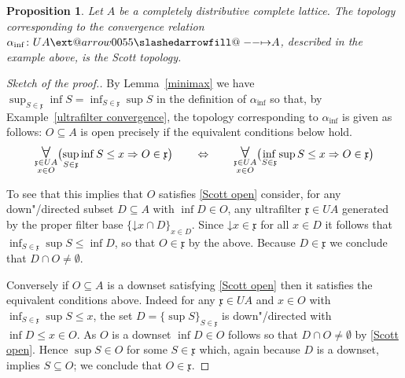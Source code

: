 \documentclass[preprint, a4paper]{elsarticle}
\makeatletter
\def\slashedarrowfill@#1#2#3#4#5{%
  $\m@th\thickmuskip0mu\medmuskip\thickmuskip\thinmuskip\thickmuskip
   \relax#5#1\mkern-7mu%
   \cleaders\hbox{$#5\mkern-2mu#2\mkern-2mu$}\hfill
   \mathclap{#3}\mathclap{#2}%
   \cleaders\hbox{$#5\mkern-2mu#2\mkern-2mu$}\hfill
   \mkern-7mu#4$%
}
\def\rightslashedarrowfill@{%
  \slashedarrowfill@\relbar\relbar\mapstochar\rightarrow}
\newcommand\xslashedrightarrow[2][]{%
  \ext@arrow 0055{\rightslashedarrowfill@}{#1}{#2}}
\def\slashedrightarrow{\xslashedrightarrow{}}
\newtheorem{proposition}[theorem]{Proposition}
\theoremstyle{definition}
\theoremstyle{remark}
\providecommand{\exref}[1]{Example~\ref{#1}}
\providecommand{\lemref}[1]{Lemma~\ref{#1}}
\renewcommand{\implies}{\Rightarrow}
\renewcommand{\iff}{\Leftrightarrow}
\providecommand{\mf}[1]{\mathfrak{#1}}
\providecommand{\brcs}[1]{\lbrace #1 \rbrace}
\providecommand{\bigpars}[1]{\bigl(#1\bigr)}
\providecommand{\set}[1]{\brcs{#1}}
\providecommand{\isect}{\cap}
\DeclareMathOperator\ForallOp{\mbox{\Large $\mathsurround0pt\forall$}}
\newcommand\Forall{\ForallOp\displaylimits}
\providecommand{\downset}{\mathord\downarrow}
\providecommand{\hmap}[3]{#1\colon#2\slashedrightarrow#3}
\providecommand{\2}{\mathsf 2}
\makeatother
\begin{document}
	\begin{proposition}
		Let $A$ be a completely distributive complete lattice. The topology corresponding to the convergence relation $\hmap{\alpha_{\inf}}{UA}A$, described in the example above, is the Scott topology. 
	\end{proposition}
	\begin{proof}[Sketch of the proof.]
		By \lemref{minimax} we have $\sup_{S \in \mf x} \inf S = \inf_{S \in \mf x} \sup S$ in the definition of $\alpha_{\inf}$ so that, by \exref{ultrafilter convergence}, the topology corresponding to $\alpha_{\inf}$ is given as follows: $O \subseteq A$ is open precisely if the equivalent conditions below hold.
		\begin{displaymath}
			\Forall_{\substack{\mf x \in UA \\ x \in O}} \bigpars{\sup_{S \in \mf x} \inf S \leq x \implies O \in \mf x} \qquad \iff \qquad \Forall_{\substack{\mf x \in UA \\ x \in O}} \bigpars{\inf_{S \in \mf x} \sup S \leq x \implies O \in \mf x}
		\end{displaymath}
		
		To see that this implies that $O$ satisfies \eqref{Scott open} consider, for any down"/directed subset $D \subseteq A$ with $\inf D \in O$, any ultrafilter $\mf x \in UA$ generated by the proper filter base $\set{\downset x \isect D}_{x \in D}$. Since $\downset x \in \mf x$ for all $x \in D$ it follows that $\inf_{S \in \mf x} \sup S \leq \inf D$, so that $O \in \mf x$ by the above. Because $D \in \mf x$ we conclude that $D \isect O \neq \emptyset$.
		
		Conversely if $O \subseteq A$ is a downset satisfying \eqref{Scott open} then it satisfies the equivalent conditions above. Indeed for any $\mf x \in UA$ and $x \in O$ with $\inf_{S \in \mf x} \sup S \leq x$, the set $D = \set{\sup S}_{S \in \mf x}$ is down"/directed with $\inf D \leq x \in O$. As $O$ is a downset $\inf D \in O$ follows so that $D \isect O \neq \emptyset$ by \eqref{Scott open}. Hence $\sup S \in O$ for some $S \in \mf x$ which, again because $D$ is a downset, implies $S \subseteq O$; we conclude that $O \in \mf x$.
	\end{proof}
\end{document}
